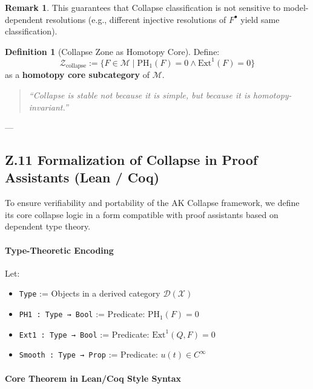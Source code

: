 \documentclass[11pt]{article}
\theoremstyle{definition}
\newtheorem{definition}[theorem]{Definition}
\newtheorem{remark}[theorem]{Remark}
\begin{document}
\begin{remark}
This guarantees that Collapse classification is not sensitive to model-dependent resolutions  
(e.g., different injective resolutions of $F^\bullet$ yield same classification).
\end{remark}

\begin{definition}[Collapse Zone as Homotopy Core]
Define:
\[
\mathcal{Z}_{\text{collapse}} := \{ F \in \mathcal{M} \mid \mathrm{PH}_1(F) = 0 \land \mathrm{Ext}^1(F) = 0 \}
\]
as a \textbf{homotopy core subcategory} of $\mathcal{M}$.
\end{definition}

\begin{quote}
\textit{“Collapse is stable not because it is simple, but because it is homotopy-invariant.”}
\end{quote}

---

\subsection*{Z.11 Formalization of Collapse in Proof Assistants (Lean / Coq)}

To ensure verifiability and portability of the AK Collapse framework,  
we define its core collapse logic in a form compatible with proof assistants based on dependent type theory.

\paragraph{Type-Theoretic Encoding}

Let:

\begin{itemize}
  \item \texttt{Type} := Objects in a derived category \( \mathcal{D}(\mathcal{X}) \)
  \item \texttt{PH1 : Type → Bool} := Predicate: \( \mathrm{PH}_1(F) = 0 \)
  \item \texttt{Ext1 : Type → Bool} := Predicate: \( \mathrm{Ext}^1(Q,F) = 0 \)
  \item \texttt{Smooth : Type → Prop} := Predicate: \( u(t) \in C^\infty \)
\end{itemize}

\paragraph{Core Theorem in Lean/Coq Style Syntax}
\end{document}
